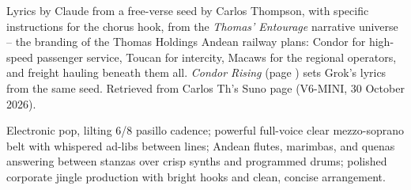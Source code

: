 
\label{sec:the-condor-line}
\begin{notes}
Lyrics by Claude from a free-verse seed by Carlos Thompson, with specific instructions for the chorus hook, from the \emph{Thomas' Entourage} narrative universe -- the branding of the Thomas Holdings Andean railway plans: Condor for high-speed passenger service, Toucan for intercity, Macaws for the regional operators, and freight hauling beneath them all. \emph{Condor Rising} (page \pageref{sec:condor-rising}) sets Grok's lyrics from the same seed. Retrieved from Carlos Th's Suno page (V6-MINI, 30 October 2026).
\end{notes}
\begin{style}
Electronic pop, lilting 6/8 pasillo cadence; powerful full-voice clear mezzo-soprano belt with whispered ad-libs between lines; Andean flutes, marimbas, and quenas answering between stanzas over crisp synths and programmed drums; polished corporate jingle production with bright hooks and clean, concise arrangement.
\end{style}
